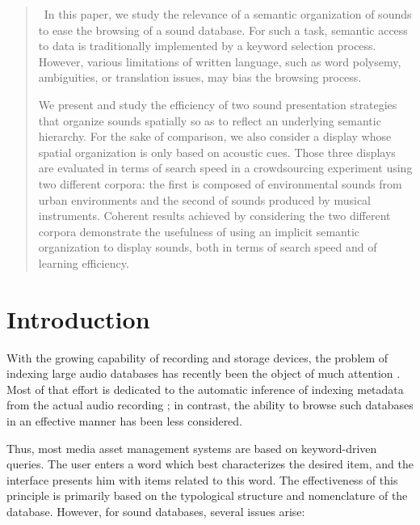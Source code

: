 \documentclass{aes2e}
\begin{document}
\maketitle

\begin{abstract}
~In this paper, we study the relevance of a semantic organization of sounds to ease the browsing of a sound database. For such a task, semantic access to data is traditionally implemented by a keyword selection process. However, various limitations of written language, such as word polysemy, ambiguities, or translation issues, may bias the browsing process.

We present and study the efficiency of two sound presentation strategies that organize sounds spatially so as to reflect an underlying semantic hierarchy. For the sake of comparison, we also consider a display whose spatial organization is only based on acoustic cues. Those three displays are evaluated in terms of search speed in a crowdsourcing experiment using two different corpora: the first is composed of environmental sounds from urban environments and the second of sounds produced by musical instruments. Coherent results achieved by considering the two different corpora demonstrate the usefulness of using an implicit semantic organization to display sounds, both in terms of search speed and of learning efficiency. 
\end{abstract}


\section{Introduction}

With the growing capability of recording and storage devices, the problem of indexing large audio databases has recently been the object of much attention \cite{Wold1996}. Most of that effort is dedicated to the automatic inference of indexing metadata from the actual audio recording \cite{Zhang1999, tzanetakis2002musical}; in contrast, the ability to browse such databases in an effective manner has been less considered.

Thus, most media asset management systems are based on keyword-driven queries. The user enters a word which best characterizes the desired item, and the interface presents him with items related to this word. The effectiveness of this principle is primarily based on the typological structure and nomenclature of the database. However, for sound databases, several issues arise:
\end{document}
